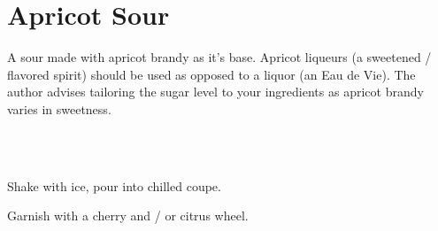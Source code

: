\section[Apricot Sour]{
    Apricot Sour
}

\begin{recipestats}[
        servings=1,
        preptime=5~\minute,
        source=\citeauthor{cocktailPartyApricotSour}~\cite{cocktailPartyApricotSour},
        original=\citeauthor{joyOfMixologyRegan}~\cite{joyOfMixologyRegan},
    ]
\end{recipestats}


\begin{recipeabstract}
    A sour made with apricot brandy as it's base.
    Apricot liqueurs (a sweetened / flavored spirit) should be used as
    opposed to a liquor (an Eau de
    Vie)\cite{cocktailPartyApricotSour}\cite{joyOfMixologyRegan}.
    The author advises tailoring the sugar level to your ingredients as
    apricot brandy varies in sweetness\cite{cocktailPartyApricotSour}.
\end{recipeabstract}


\begin{ingredientcolumns}[1]
    \begin{ingredientblock}
        \\
        \\
    \end{ingredientblock}
\end{ingredientcolumns}

\begin{preparation}
\item Shake with ice, pour into chilled coupe.
\item Garnish with a cherry and / or citrus wheel.
\end{preparation}

\recipeend%

